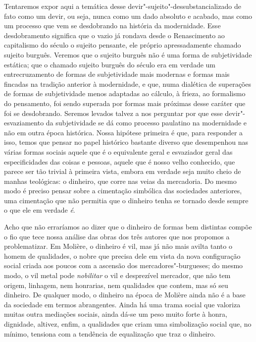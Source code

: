 Tentaremos expor aqui a temática desse devir"-sujeito"-dessubstancializado
de fato como um devir, ou seja, nunca como um dado absoluto e acabado,
mas como um processo que vem se desdobrando na história da modernidade.
Esse desdobramento significa que o vazio já rondava desde o Renascimento
ao capitalismo do século  o sujeito pensante, ele próprio
apressadamente chamado sujeito burguês. Veremos que o sujeito burguês
não é uma forma de subjetividade estática; que o chamado sujeito burguês
do século  era em verdade um entrecruzamento de formas de
subjetividade mais modernas e formas mais fincadas na tradição anterior
à modernidade, e que, numa dialética de superações de formas de
subjetividade menos adaptadas ao cálculo, à frieza, ao formalismo do
pensamento, foi sendo superada por formas mais próximas desse caráter
que foi se desdobrando. Seremos levados talvez a nos perguntar por que
esse devir"-esvaziamento da subjetividade se dá como processo paulatino
na modernidade e não em outra época histórica. Nossa hipótese primeira é
que, para responder a isso, temos que pensar no papel histórico bastante
diverso que desempenhou nas várias formas sociais aquele que é o
equivalente geral e esvaziador geral das especificidades das coisas e
pessoas, aquele que é nosso velho conhecido, que parece ser tão trivial
à primeira vista, embora em verdade seja muito cheio de manhas
teológicas: o dinheiro, que corre nas veias da mercadoria. Do mesmo modo
é preciso pensar sobre a cimentação simbólica das sociedades anteriores,
uma cimentação que não permitia que o dinheiro tenha se tornado desde
sempre o que ele em verdade \emph{é}.

Acho que não erraríamos ao dizer que o dinheiro de formas bem distintas
compõe o fio que tece nossa análise das obras dos três autores que nos
propomos a problematizar. Em Molière, o dinheiro é vil, mas já não mais
avilta tanto o homem de qualidades, o nobre que precisa dele em vista da
nova configuração social criada aos poucos com a ascensão dos
mercadores"-burgueses; do mesmo modo, o vil metal pode \emph{nobilitar} o
vil e desprezível mercador, que não tem origem, linhagem, nem honrarias,
nem qualidades que contem, mas só seu dinheiro. De qualquer modo, o
dinheiro na época de Molière ainda não é a base da sociedade em termos
abrangentes. Ainda há uma trama social que valoriza muitas outra
mediações sociais, ainda dá-se um peso muito forte à honra, dignidade,
altivez, enfim, a qualidades que criam uma simbolização social que, no
mínimo, tensiona com a tendência de equalização que traz o dinheiro.

